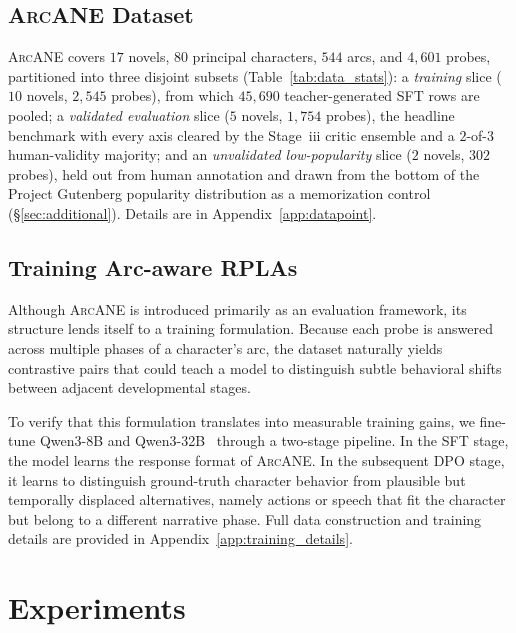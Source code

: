 \documentclass{llmxive}
\providecommand{\ours}{\textsc{ArcANE}}
\begin{document}
\subsection{\ours{} Dataset}
\label{sec:dataset}

\ours{} covers $17$ novels, $80$ principal characters, $544$ arcs, and $4{,}601$ probes, partitioned into three disjoint subsets (Table~\ref{tab:data_stats}): a \emph{training} slice ($10$ novels, $2{,}545$ probes), from which $45{,}690$ teacher-generated SFT rows are pooled; a \emph{validated evaluation} slice ($5$ novels, $1{,}754$ probes), the headline benchmark with every axis cleared by the Stage~iii critic ensemble and a $2$-of-$3$ human-validity majority; and an \emph{unvalidated low-popularity} slice ($2$ novels, $302$ probes), held out from human annotation and drawn from the bottom of the Project Gutenberg popularity distribution as a memorization control (\S\ref{sec:additional}). Details are in Appendix~\ref{app:datapoint}.

\subsection{Training Arc-aware RPLAs}
\label{sec:training_rpla}

Although \ours{} is introduced primarily as an evaluation framework, its structure lends itself to a training formulation. Because each probe is answered across multiple phases of a character's arc, the dataset naturally yields contrastive pairs that could teach a model to distinguish subtle behavioral shifts between adjacent developmental stages.

To verify that this formulation translates into measurable training gains, we fine-tune Qwen3-8B and Qwen3-32B~\citep{yang2025qwen3} through a two-stage pipeline. In the SFT stage, the model learns the response format of \ours{}. In the subsequent DPO stage, it learns to distinguish ground-truth character behavior from plausible but temporally displaced alternatives, namely actions or speech that fit the character but belong to a different narrative phase. Full data construction and training details are provided in Appendix~\ref{app:training_details}.


\section{Experiments}
\label{sec:experiments}
\end{document}
